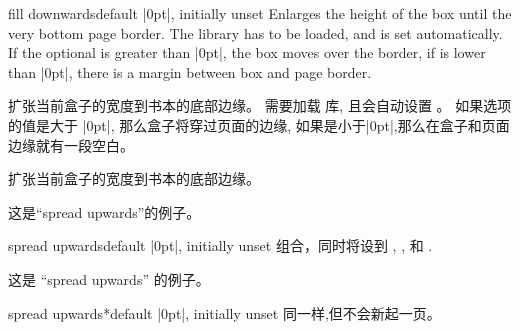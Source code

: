 \begin{docTcbKey}[][doc new=2017-02-13]{fill downwards}{}{default |0pt|, initially unset}
Enlarges the height of the box until the very bottom page border.
The library  has to be loaded, and
 is set automatically.
If the optional  is greater than |0pt|, the box
moves over the border, if  is lower than |0pt|, there is a
margin between box and page border.

扩张当前盒子的宽度到书本的底部边缘。%
需要加载  库, 且会自动设置 。%
如果选项的值是大于 |0pt|, 那么盒子将穿过页面的边缘, 如果是小于|0pt|,那么在盒子和页面边缘就有一段空白。
\begin{dispListing}
\begin{tcolorbox}[enhanced,fill downwards,
colframe=blue!75!black,colback=white,show bounding box]
扩张当前盒子的宽度到书本的底部边缘。
\end{tcolorbox}
\end{dispListing}
{\tcbusetemp}
\end{docTcbKey}


\begin{tcolorbox}[enhanced,spread upwards,sharp corners=north,height=3cm,
colframe=blue!75!black,interior style={top color=blue!50,bottom color=white}]
这是\enquote{spread upwards}的例子。 
\end{tcolorbox}
\begin{docTcbKey}[][doc new=2017-02-13]{spread upwards}{}{default |0pt|, initially unset}
组合，同时将设到
, , 和 .
\begin{dispListing}
\begin{tcolorbox}[enhanced,spread upwards,sharp corners=north,height=3cm,
colframe=blue!75!black,interior style={top color=blue!50,bottom color=white}]
这是 \enquote{spread upwards} 的例子。
\end{tcolorbox}
\end{dispListing}
\end{docTcbKey}


\begin{docTcbKey}[][doc new=2017-02-13]{spread upwards*}{}{default |0pt|, initially unset}
同一样,但不会新起一页。
\end{docTcbKey}




